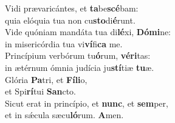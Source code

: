 \evenverse Vidi prævaricántes, et \textbf{ta}be\textbf{scé}bam:~\*\\
\evenverse quia elóquia tua non cu\textbf{sto}di\textbf{é}runt.\\
\oddverse Vide quóniam mandáta tua di\textbf{lé}xi, \textbf{Dó}\textbf{mi}ne:~\*\\
\oddverse in misericórdia tua vi\textbf{ví}fi\textbf{ca} me.\\
\evenverse Princípium verbórum tu\textbf{ó}rum, \textbf{vé}\textbf{ri}tas:~\*\\
\evenverse in ætérnum ómnia judícia ju\textbf{stí}tiæ \textbf{tu}æ.\\
\oddverse Glória \textbf{Pa}tri, et \textbf{Fí}\textbf{li}o,~\*\\
\oddverse et Spi\textbf{rí}tui \textbf{San}cto.\\
\evenverse Sicut erat in princípio, et \textbf{nunc}, et \textbf{sem}per,~\*\\
\evenverse et in sǽcula sæcu\textbf{ló}rum. \textbf{A}men.\\
